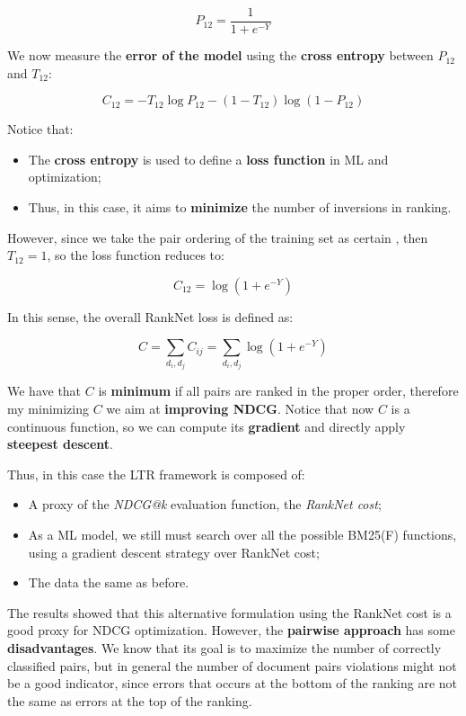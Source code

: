 $$
P_{12} = \frac{1}{ 1+ e^{-Y}}
$$

We now measure the \textbf{error of the model} using the \textbf{cross entropy} between $P_{12}$ and $T_{12}$:

$$
C_{12} = -T_{12} \log P_{12} - (1 - T_{12}) \log (1-P_{12})
$$

Notice that:

\begin{itemize}
    \item The \textbf{cross entropy} is used to define a \textbf{loss function} in ML and optimization;
    \item Thus, in this case, it aims to \textbf{minimize} the number of inversions in ranking.
\end{itemize}

However, since we take the pair ordering of the training set as certain , then $T_{12} = 1$, so the loss function reduces to:

$$
C_{12} = \log (1 + e^{-Y})
$$

In this sense, the overall RankNet loss is defined as:

$$
C = \sum_{d_i,d_j} C_{ij} = \sum_{d_i,d_j} \log (1 + e^{-Y})
$$

We have that $C$ is \textbf{minimum} if all pairs are ranked in the proper order, therefore my minimizing $C$ we aim at \textbf{improving NDCG}. Notice that now $C$ is a continuous function, so we can compute its \textbf{gradient} and directly apply \textbf{steepest descent}.

Thus, in this case the LTR framework is composed of:

\begin{itemize}
    \item A proxy of the \textit{NDCG@k} evaluation function, the \textit{RankNet cost};
    \item As a ML model, we still must search over all the possible BM25(F) functions, using a gradient descent strategy over RankNet cost;
    \item The data the same as before.
\end{itemize}

The results showed that this alternative formulation using the RankNet cost is a good proxy for NDCG optimization. However, the \textbf{pairwise approach} has some \textbf{disadvantages}. We know that its goal is to maximize the number of correctly classified pairs, but in general the number of document pairs violations might not be a good indicator, since errors that occurs at the bottom of the ranking are not the same as errors at the top of the ranking.

